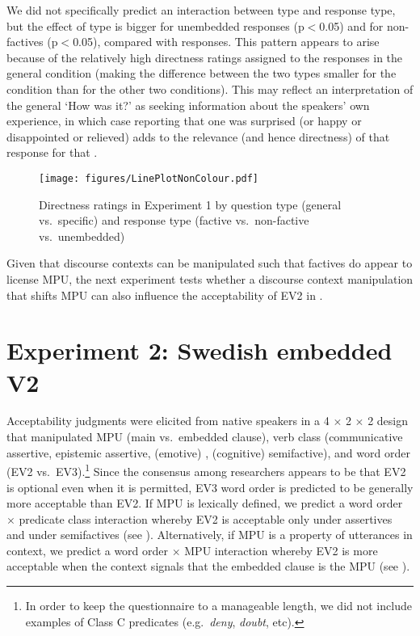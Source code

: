 \documentclass[output=paper]{langsci/langscibook}
\begin{document}
We did not specifically predict an interaction between  type and response type, but the effect of  type is bigger for unembedded responses (p$<$0.05) and for non-factives (p$<$0.05), compared with  responses.  This pattern appears to arise because of the relatively high directness ratings assigned to the  responses in the general  condition (making the difference between the two  types smaller for the  condition than for the other two conditions). This may reflect an interpretation of the general  `How was it?' as seeking information about the speakers' own experience, in which case reporting that one was surprised (or happy or disappointed or relieved) adds to the relevance (and hence directness) of that response for that . 

\begin{figure}%
\texttt{[image: figures/LinePlotNonColour.pdf]}
\caption{Directness ratings in Experiment 1 by question type (general vs.\ specific) and response type (factive vs.\ non-factive vs.\ unembedded)}
\label{fig:ev2:englishStudy}
\end{figure} 

Given that discourse contexts can be manipulated such that factives do appear to license MPU, the next experiment tests whether a discourse context manipulation that shifts MPU can also influence the acceptability of EV2 in .


\section{Experiment 2: Swedish embedded V2}

Acceptability judgments were elicited from native  speakers in a 4 $\times$ 2 $\times$ 2 design that manipulated MPU (main vs.\ embedded clause), verb class (communicative assertive, epistemic assertive, (emotive) , (cognitive) semifactive),  and word order (EV2 vs.\ EV3).\footnote{In order to keep the questionnaire to a manageable length, we did not include examples of Class C predicates (e.g.\ \textit{deny}, \textit{doubt}, etc).}
 Since the consensus among researchers appears to be that EV2 is optional even when it is permitted, EV3 word order is predicted to be generally more acceptable than EV2.  If MPU is lexically defined, we predict a word order $\times$ predicate class interaction whereby EV2 is acceptable only under assertives and under semifactives (see \citealt{WiklundEtAl2009}).  Alternatively, if MPU is a property of utterances in context, we predict a word order $\times$ MPU interaction whereby EV2 is more acceptable when the context signals that the embedded clause is the MPU (see \citealt{JensenChristensen2013}).
\end{document}
